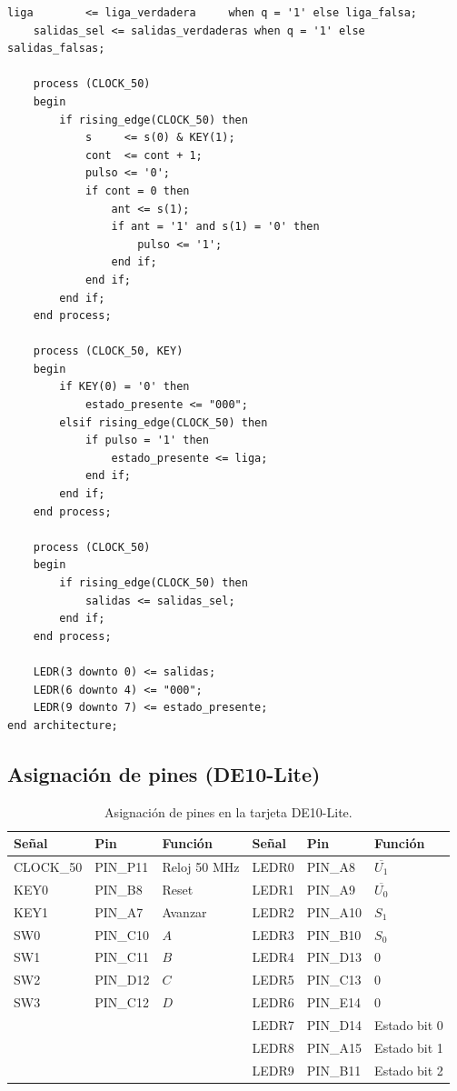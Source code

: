 \documentclass[11pt,letterpaper]{article}
\newcommand{\nb}[1]{\overline{#1}}
\begin{document}
\begin{lstlisting}[style=vhdl]
    liga        <= liga_verdadera     when q = '1' else liga_falsa;
    salidas_sel <= salidas_verdaderas when q = '1' else salidas_falsas;

    process (CLOCK_50)
    begin
        if rising_edge(CLOCK_50) then
            s     <= s(0) & KEY(1);
            cont  <= cont + 1;
            pulso <= '0';
            if cont = 0 then
                ant <= s(1);
                if ant = '1' and s(1) = '0' then
                    pulso <= '1';
                end if;
            end if;
        end if;
    end process;

    process (CLOCK_50, KEY)
    begin
        if KEY(0) = '0' then
            estado_presente <= "000";
        elsif rising_edge(CLOCK_50) then
            if pulso = '1' then
                estado_presente <= liga;
            end if;
        end if;
    end process;

    process (CLOCK_50)
    begin
        if rising_edge(CLOCK_50) then
            salidas <= salidas_sel;
        end if;
    end process;

    LEDR(3 downto 0) <= salidas;
    LEDR(6 downto 4) <= "000";
    LEDR(9 downto 7) <= estado_presente;
end architecture;
\end{lstlisting}

\subsection{Asignación de pines (DE10-Lite)}

\begin{table}[H]
\centering
\begin{tabular}{lll@{\hspace{1.5cm}}lll}
\toprule
\textbf{Señal} & \textbf{Pin} & \textbf{Función} & \textbf{Señal} & \textbf{Pin} & \textbf{Función} \\
\midrule
CLOCK\_50 & PIN\_P11 & Reloj 50 MHz & LEDR0 & PIN\_A8  & $\nb{U_1}$ \\
KEY0      & PIN\_B8  & Reset        & LEDR1 & PIN\_A9  & $\nb{U_0}$ \\
KEY1      & PIN\_A7  & Avanzar      & LEDR2 & PIN\_A10 & $S_1$ \\
SW0       & PIN\_C10 & $A$          & LEDR3 & PIN\_B10 & $S_0$ \\
SW1       & PIN\_C11 & $B$          & LEDR4 & PIN\_D13 & 0 \\
SW2       & PIN\_D12 & $C$          & LEDR5 & PIN\_C13 & 0 \\
SW3       & PIN\_C12 & $D$          & LEDR6 & PIN\_E14 & 0 \\
          &          &              & LEDR7 & PIN\_D14 & Estado bit 0 \\
          &          &              & LEDR8 & PIN\_A15 & Estado bit 1 \\
          &          &              & LEDR9 & PIN\_B11 & Estado bit 2 \\
\bottomrule
\end{tabular}
\caption{Asignación de pines en la tarjeta DE10-Lite.}
\end{table}
\end{document}

